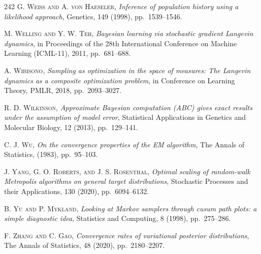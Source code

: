 \begin{thebibliography}{242}
\textsc{G. Weiss and A. von Haeseler},
\textit{Inference of population history using a likelihood approach},
Genetics, 149 (1998), pp.\ 1539--1546.

\textsc{M. Welling and Y. W. Teh},
\textit{Bayesian learning via stochastic gradient Langevin dynamics},
in Proceedings of the 28th International Conference on Machine Learning (ICML-11), 2011, pp.\ 681--688.

\textsc{A. Wibisono},
\textit{Sampling as optimization in the space of measures: The Langevin dynamics as a composite optimization problem},
in Conference on Learning Theory, PMLR, 2018, pp.\ 2093--3027.

\textsc{R. D. Wilkinson},
\textit{Approximate Bayesian computation (ABC) gives exact results under the assumption of model error},
Statistical Applications in Genetics and Molecular Biology, 12 (2013), pp.\ 129--141.

\textsc{C. J. Wu},
\textit{On the convergence properties of the EM algorithm},
The Annals of Statistics, (1983), pp.\ 95--103.

\textsc{J. Yang, G. O. Roberts, and J. S. Rosenthal},
\textit{Optimal scaling of random-walk Metropolis algorithms on general target distributions},
Stochastic Processes and their Applications, 130 (2020), pp.\ 6094--6132.

\textsc{B. Yu and P. Mykland},
\textit{Looking at Markov samplers through cusum path plots: a simple diagnostic idea},
Statistics and Computing, 8 (1998), pp.\ 275--286.

\textsc{F. Zhang and C. Gao},
\textit{Convergence rates of variational posterior distributions},
The Annals of Statistics, 48 (2020), pp.\ 2180--2207.

\end{thebibliography}
